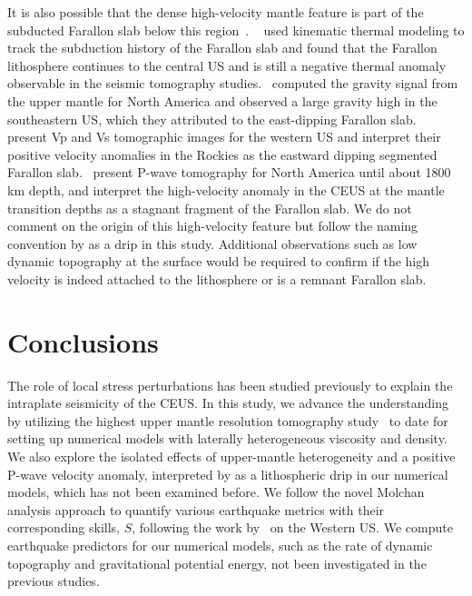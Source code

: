\documentclass[draft,linenumbers]{agujournal2018}
\begin{document}
 It is also possible that the dense high-velocity mantle feature is part of the subducted Farallon slab below this region~\citep{schmid2002fate, mooney2010north, sigloch2008two, schmandt2010complex, sigloch2011mantle}. ~\citet{schmid2002fate} used kinematic thermal modeling to track the subduction history of the Farallon slab and found that the Farallon lithosphere continues to the central US and is still a negative thermal anomaly observable in the seismic tomography studies.~\citet{mooney2010north} computed the gravity signal from the upper mantle for North America and observed a large gravity high in the southeastern US, which they attributed to the east-dipping Farallon slab.~\citet{schmandt2010complex} present Vp and Vs tomographic images for the western US and interpret their positive velocity anomalies in the Rockies as the eastward dipping segmented Farallon slab.~\citet{sigloch2008two, sigloch2011mantle} present P-wave tomography for North America until about 1800 km depth, and interpret the high-velocity anomaly in the CEUS at the mantle transition depths as a stagnant fragment of the Farallon slab.  We do not comment on the origin of this high-velocity feature but follow the naming convention by \citet{Biryol_2016} as a drip in this study. Additional observations such as low dynamic topography at the surface would be required to confirm if the high velocity is indeed attached to the lithosphere or is a remnant Farallon slab.
  
\section{Conclusions}

The role of local stress perturbations has been studied previously to explain the intraplate seismicity of the CEUS. In this study, we advance the understanding by utilizing the highest upper mantle resolution tomography study~\citep{Biryol_2016} to date for setting up numerical models with laterally heterogeneous viscosity and density. We also explore the isolated effects of upper-mantle heterogeneity and a positive P-wave velocity anomaly, interpreted by \citet{Biryol_2016} as a lithospheric drip in our numerical models, which has not been examined before. We follow the novel Molchan analysis approach to quantify various earthquake metrics with their corresponding skills, $S$, following the work by~\citet{becker2015western} on the Western US. We compute earthquake predictors for our numerical models, such as the rate of dynamic topography and gravitational potential energy, not been investigated in the previous studies.
\end{document}
